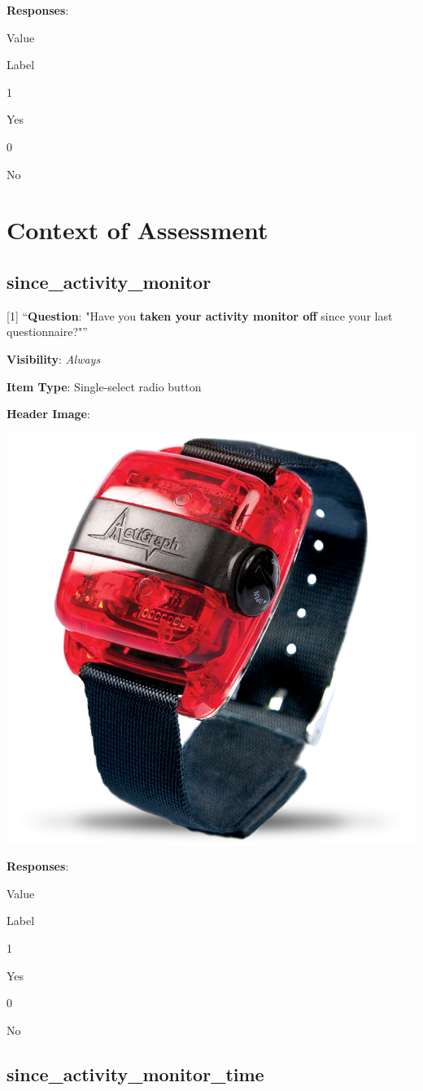\documentclass[]{book}
\begin{document}
\textbf{Responses}:

Value

Label

1

Yes

0

No

\hypertarget{context_section}{%
\chapter{Context of Assessment}\label{context_section}}

\hypertarget{since_activity_monitor}{%
\section{since\_activity\_monitor}\label{since_activity_monitor}}

{[}1{]} ``\textbf{Question}: "Have you \textbf{taken your activity monitor off} since your last questionnaire?"''

\textbf{Visibility}: \emph{Always}

\textbf{Item Type}: Single-select radio button

\textbf{Header Image}:

\begin{flushleft}\includegraphics[width=0.33\linewidth]{downloadFigs4latex_NIMH_Applet_Codebook/since_activity_monitor_headerImg} \end{flushleft}

\textbf{Responses}:

Value

Label

1

Yes

0

No

\hypertarget{since_activity_monitor_time}{%
\section{since\_activity\_monitor\_time}\label{since_activity_monitor_time}}
\end{document}

